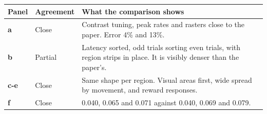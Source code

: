 \begin{longtable}{@{}p{1.1cm}p{2.5cm}p{11.8cm}@{}}
\toprule
Panel & Agreement & What the comparison shows \\
\midrule
\endhead
\textbf{a} & Close & Contrast tuning, peak rates and rasters close to the paper. Error 4\% and 13\%. \\
\textbf{b} & Partial & Latency sorted, odd trials sorting even trials, with region strips in place. It is visibly denser than the paper's. \\
\textbf{c-e} & Close & Same shape per region. Visual areas first, wide spread by movement, and reward responses. \\
\textbf{f} & Close & 0.040, 0.065 and 0.071 against 0.040, 0.069 and 0.079. \\
\bottomrule
\end{longtable}
